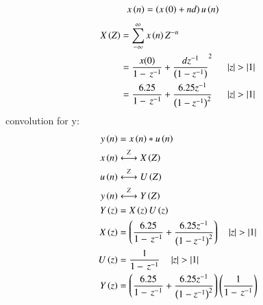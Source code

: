 \documentclass[journal,12pt,twocolumn]{IEEEtran}
\theoremstyle{remark}
\begin{document}
\begin{align}
x\left(n\right)&=\left(x\left(0\right)+nd\right)u\left(n\right)
\end{align}
\begin{align}
X\left(Z\right)&=\sum_{-\infty}^{\infty}x\left(n\right)Z^{-n}\\\
&=\frac{x(0)}{1-\,z^{-1}}+\frac{dz^{-1}}{\left(1-{z^{-1}}\right)}^2\:\:
\quad\left\vert z\right\vert>\left\vert1\right\vert\\
&=\frac{6.25}{1-\,z^{-1}}+\frac{6.25z^{-1}}{\left(1-{z^{-1}}\right)^2}\:\:\quad\left\vert z\right\vert>\left\vert1\right\vert
\end{align}
convolution for y:
\begin{align}
y\left(n\right)&=x\left(n\right)*u\left(n\right)\\
x\left(n\right)&\overset{Z}{\longleftrightarrow}  X\left(Z\right)\\
u\left(n\right)&\overset{Z}{\longleftrightarrow}  U\left(Z\right)\\
y\left(n\right)&\overset{Z}{\longleftrightarrow}  Y\left(Z\right)\\
Y\left(z\right)&=X\left(z\right)U\left(z\right)\\
X\left(z\right)&=\left(\frac{6.25}{1-\,z^{-1}}+\frac{6.25z^{-1}}{\left(1-{z^{-1}}\right)^2}\right)\quad\left\vert z\right\vert>\left\vert1\right\vert\\
U\left(z\right)&=\frac{1}{1-\,z^{-1}}\quad\left\vert z\right\vert>\left\vert1\right\vert\\
Y\left(z\right)&=\left(\frac{6.25}{1-\,z^{-1}}+\frac{6.25z^{-1}}{\left(1-{z^{-1}}\right)^2}\right)\left(\frac{1}{1-\,z^{-1}}\right)
\end{align}
 
\end{document}
